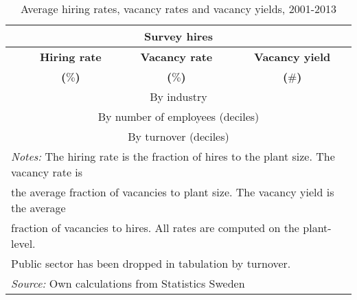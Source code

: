       \begin{table}[htbp]\centering
			\scriptsize
      \caption{\label{tab:vacancy_yield_survey} Average hiring rates, vacancy rates and vacancy yields, 2001-2013  
      \textbf{} }\begin{tabularx} {\textwidth} {  l  c  c  c} \\ \hline %
     \multicolumn{4}{c}{ \textbf{Survey hires}}  \\ \midrule
		\textbf{ } & \textbf{ Hiring rate } & \textbf{ Vacancy rate } & \textbf{  Vacancy yield  } \\
			\textbf{ } & \textbf{  ($\%$) } & \textbf{ ($\%$) } & \textbf{ ($\#$) } \\
      \midrule
			    \multicolumn{4}{c}{By industry} \\
			\midrule

     \midrule
						   \multicolumn{4}{c}{By number of employees (deciles)} \\
			\midrule

     \midrule
						  \multicolumn{4}{c}{By turnover (deciles)} \\
			\midrule

				\hline
      \multicolumn{4}{l}{\footnotesize{\emph{Notes:} The hiring rate is the fraction of hires to the plant size.  The vacancy rate is }} \\
			\multicolumn{4}{l}{\footnotesize{the average fraction of vacancies to plant size. The vacancy yield is the average} } \\
			\multicolumn{4}{l}{\footnotesize{ fraction of vacancies to hires. All rates are computed  on the plant-level.}} \\
			\multicolumn{4}{l}{\footnotesize{ Public sector has been dropped in tabulation by turnover.} } \\ 
			\multicolumn{4}{l}{\footnotesize{\emph{Source:} Own calculations from Statistics Sweden } }

      \end{tabularx}
      \end{table}
